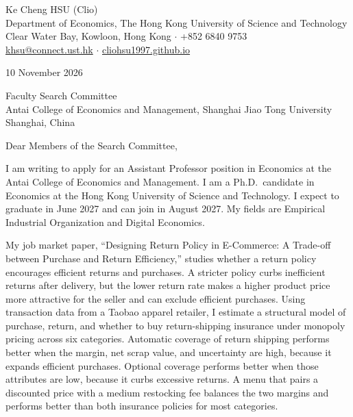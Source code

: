 \documentclass[11pt]{article}
\begin{document}
\begin{flushleft}
Ke Cheng HSU (Clio) \\
Department of Economics, The Hong Kong University of Science and Technology \\
Clear Water Bay, Kowloon, Hong Kong $\cdot$ +852 6840 9753 \\
\href{mailto:khsu@connect.ust.hk}{khsu@connect.ust.hk} $\cdot$ \href{https://cliohsu1997.github.io/}{cliohsu1997.github.io}
\end{flushleft}

10 November 2026

\vspace{0.15em}
Faculty Search Committee \\
Antai College of Economics and Management, Shanghai Jiao Tong University \\
Shanghai, China

\vspace{0.15em}
Dear Members of the Search Committee,

I am writing to apply for an Assistant Professor position in Economics at the Antai College of Economics and Management. I am a Ph.D.\ candidate in Economics at the Hong Kong University of Science and Technology. I expect to graduate in June 2027 and can join in August 2027. My fields are Empirical Industrial Organization and Digital Economics.

My job market paper, ``Designing Return Policy in E-Commerce: A Trade-off between Purchase and Return Efficiency,'' studies whether a return policy encourages efficient returns and purchases. A stricter policy curbs inefficient returns after delivery, but the lower return rate makes a higher product price more attractive for the seller and can exclude efficient purchases. Using transaction data from a Taobao apparel retailer, I estimate a structural model of purchase, return, and whether to buy return-shipping insurance under monopoly pricing across six categories. Automatic coverage of return shipping performs better when the margin, net scrap value, and uncertainty are high, because it expands efficient purchases. Optional coverage performs better when those attributes are low, because it curbs excessive returns. A menu that pairs a discounted price with a medium restocking fee balances the two margins and performs better than both insurance policies for most categories.
\end{document}
